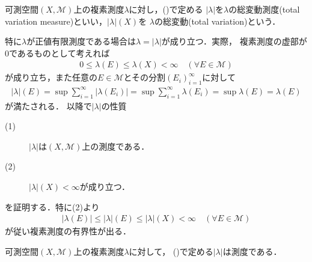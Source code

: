 	\begin{screen}
		\begin{dfn}
			可測空間$(X,\mathcal{M})$上の複素測度$\lambda$に対し，()で定める
			$|\lambda|$を$\lambda$の総変動測度(total variation measure)といい，$|\lambda|(X)$を
			$\lambda$の総変動(total variation)という．
		\end{dfn}
	\end{screen}
	特に$\lambda$が正値有限測度である場合は$\lambda = |\lambda|$が成り立つ．実際，
	複素測度の虚部が0であるものとして考えれば
	\begin{align}
		0 \leq \lambda(E) \leq \lambda(X) < \infty
		\quad (\forall E \in \mathcal{M})
	\end{align}
	が成り立ち，また任意の$E \in \mathcal{M}$とその分割$(E_i)_{i=1}^{\infty}$に対して
	\begin{align}
		|\lambda|(E) = \sup{}{\sum_{i=1}^{\infty} |\lambda(E_i)|} = \sup{}{\sum_{i=1}^{\infty} \lambda(E_i)} = \sup{}{\lambda(E)} = \lambda(E)
	\end{align}
	が満たされる．
	以降で$|\lambda|$の性質
	\begin{description}
		\item[(1)] $|\lambda|$は$(X,\mathcal{M})$上の測度である．
		\item[(2)] $|\lambda|(X) < \infty$が成り立つ．
	\end{description}
	を証明する．特に(2)より
	\begin{align}
		|\lambda(E)| \leq |\lambda|(E) \leq |\lambda|(X) < \infty
		\quad (\forall E \in \mathcal{M})
	\end{align}
	が従い複素測度の有界性が出る．

	\begin{screen}
		\begin{thm}
			可測空間$(X,\mathcal{M})$上の複素測度$\lambda$に対して，
			()で定める$|\lambda|$は測度である．
			\label{thm:total_variation_measure}
		\end{thm}
	\end{screen}
	
